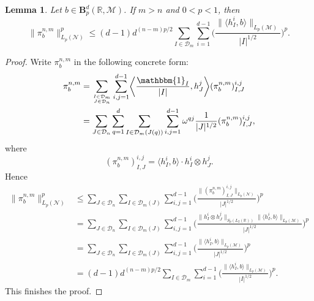 \documentclass[oneside,english,a4wide]{amsart}
\numberwithin{equation}{section}
\numberwithin{figure}{section}
\theoremstyle{plain}
\theoremstyle{plain}
\theoremstyle{definition}
\theoremstyle{plain}
\newtheorem{lemma}[thm]{Lemma}
\theoremstyle{remark}
\theoremstyle{definition}
\theoremstyle{remark}
\theoremstyle{definition}
\newcommand{\M}{{\mathcal M}}
\newcommand{\8}{\infty}
\begin{document}
\begin{lemma}\label{lem3.2}
	Let $b\in\pmb{B}^d_p(\mathbb{R},\M)$. If $m>n$ and $0<p<1$, then
	\begin{equation*}
		\|\pi_b^{n,m}\|^p_{L_p(\mathcal{N})}\le (d-1)d^{(n-m)p/2}\sum_{I\in \mathcal{D}_m}\sum_{i=1}^{d-1}\biggl(\frac{\|\langle h_I^i,b\rangle\|_{L_p(\mathcal{M})}}{|I|^{1/2}}\biggr)^p.
	\end{equation*}
\end{lemma}
\begin{proof}
	Write $\pi_b^{n,m}$ in the following concrete form:
	\begin{equation}\label{pibnmsum}
		\begin{aligned}
			\pi_b^{n,m}{}&=\sum_{I\in \mathcal{D}_m\atop J\in \mathcal{D}_n}\sum_{i,j=1}^{d-1}\biggl\langle \frac{\mathbbm{1}_I}{|I|},h_J^j\biggr\rangle(\pi_b^{n,m})_{I,J}^{i,j}\\&=\sum_{J\in \mathcal{D}_n}\sum_{q=1}^d\sum_{I\in \mathcal{D}_m(J(q))}\sum_{i,j=1}^{d-1}\omega^{qj}\frac{1}{|J|^{1/2}}(\pi_b^{n,m})_{I,J}^{i,j},
		\end{aligned}
	\end{equation}
	where 
	\begin{equation*}
		(\pi_b^{n,m})_{I,J}^{i,j}=\langle h_I^i,b\rangle\cdot h_I^i\otimes h_J^j.
	\end{equation*}
	Hence
	\begin{equation*}
		\begin{aligned}
			\|\pi_b^{n,m}\|^p_{L_p(\mathcal{N})}{}&\le \sum_{J\in \mathcal{D}_n}\sum_{I\in \mathcal{D}_m(J)}\sum_{i,j=1}^{d-1}\biggl(\frac{\|(\pi_b^{n,m})_{I,J}^{i,j}\|_{L_p(\mathcal{N})}}{|J|^{1/2}}\biggr)^p\\&=\sum_{J\in \mathcal{D}_n}\sum_{I\in \mathcal{D}_m(J)}\sum_{i,j=1}^{d-1}\biggl(\frac{\|h_I^i\otimes h_J^j\|_{S_p(L_2(\mathbb{R}))}\|\langle h_I^i,b\rangle\|_{L_p(\mathcal{M})}}{|J|^{1/2}}\biggr)^p\\&=\sum_{J\in \mathcal{D}_n}\sum_{I\in \mathcal{D}_m(J)}\sum_{i,j=1}^{d-1}\biggl(\frac{\|\langle h_I^i,b\rangle\|_{L_p(\mathcal{M})}}{|J|^{1/2}}\biggr)^p\\&=(d-1)d^{(n-m)p/2}\sum_{I\in \mathcal{D}_m}\sum_{i=1}^{d-1}\biggl(\frac{\|\langle h_I^i,b\rangle\|_{L_p(\mathcal{M})}}{|I|^{1/2}}\biggr)^p.
		\end{aligned}
	\end{equation*}
	This finishes the proof.
\end{proof}
\end{document}
